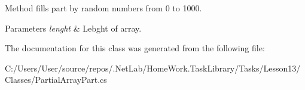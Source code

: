 Method fills part by random numbers from 0 to 1000. 


\begin{DoxyParams}{Parameters}
{\em lenght} & Lebght of array.\\
\hline
\end{DoxyParams}


The documentation for this class was generated from the following file\+:\begin{DoxyCompactItemize}
\item 
C\+:/\+Users/\+User/source/repos/.\+Net\+Lab/\+Home\+Work.\+Task\+Library/\+Tasks/\+Lesson13/\+Classes/Partial\+Array\+Part.\+cs\end{DoxyCompactItemize}
